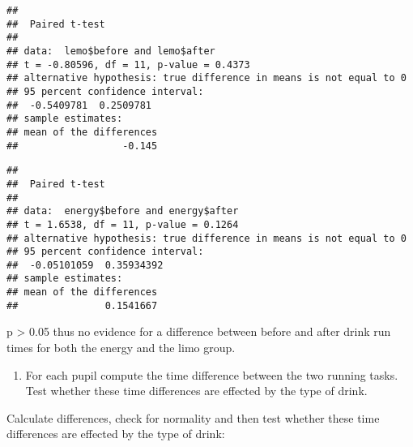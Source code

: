 \documentclass[
]{article}
\newenvironment{Shaded}{\begin{snugshade}}{\end{snugshade}}
\newcommand{\AttributeTok}[1]{\textcolor[rgb]{0.77,0.63,0.00}{#1}}
\newcommand{\CommentTok}[1]{\textcolor[rgb]{0.56,0.35,0.01}{\textit{#1}}}
\newcommand{\ConstantTok}[1]{\textcolor[rgb]{0.00,0.00,0.00}{#1}}
\newcommand{\FunctionTok}[1]{\textcolor[rgb]{0.00,0.00,0.00}{#1}}
\newcommand{\NormalTok}[1]{#1}
\newcommand{\OtherTok}[1]{\textcolor[rgb]{0.56,0.35,0.01}{#1}}
\newcommand{\SpecialCharTok}[1]{\textcolor[rgb]{0.00,0.00,0.00}{#1}}
\providecommand{\tightlist}{%
  \setlength{\itemsep}{0pt}\setlength{\parskip}{0pt}}
\begin{document}
\begin{verbatim}
## 
##  Paired t-test
## 
## data:  lemo$before and lemo$after
## t = -0.80596, df = 11, p-value = 0.4373
## alternative hypothesis: true difference in means is not equal to 0
## 95 percent confidence interval:
##  -0.5409781  0.2509781
## sample estimates:
## mean of the differences 
##                  -0.145
\end{verbatim}

\begin{Shaded}
\end{Shaded}

\begin{verbatim}
## 
##  Paired t-test
## 
## data:  energy$before and energy$after
## t = 1.6538, df = 11, p-value = 0.1264
## alternative hypothesis: true difference in means is not equal to 0
## 95 percent confidence interval:
##  -0.05101059  0.35934392
## sample estimates:
## mean of the differences 
##               0.1541667
\end{verbatim}

p \textgreater{} 0.05 thus no evidence for a difference between before
and after drink run times for both the energy and the limo group.

\begin{enumerate}
\def\labelenumi{\alph{enumi})}
\setcounter{enumi}{2}
\tightlist
\item
  For each pupil compute the time difference between the two running
  tasks. Test whether these time differences are effected by the type of
  drink.
\end{enumerate}

Calculate differences, check for normality and then test whether these
time differences are effected by the type of drink:

\begin{Shaded}
\end{Shaded}
\end{document}
